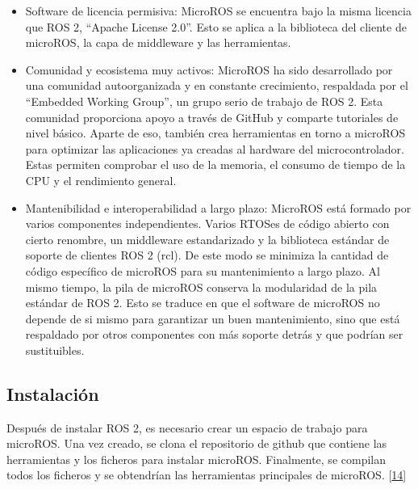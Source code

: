 \documentclass[a4paper,11pt,spanish]{sphinxmanual}
\begin{document}
\begin{itemize}
\item {} 
\sphinxAtStartPar
Software de licencia permisiva: Micro\sphinxhyphen{}ROS se encuentra bajo la misma
licencia que ROS 2, “Apache License 2.0”. Esto se aplica a la
biblioteca del cliente de micro\sphinxhyphen{}ROS, la capa de middleware y las
herramientas.

\item {} 
\sphinxAtStartPar
Comunidad y ecosistema muy activos: Micro\sphinxhyphen{}ROS ha sido desarrollado
por una comunidad auto\sphinxhyphen{}organizada y en constante crecimiento,
respaldada por el “Embedded Working Group”, un grupo serio de trabajo
de ROS 2. Esta comunidad proporciona apoyo a través de GitHub y
comparte tutoriales de nivel básico. Aparte de eso, también crea
herramientas en torno a micro\sphinxhyphen{}ROS para optimizar las aplicaciones ya
creadas al hardware del microcontrolador. Estas permiten comprobar el
uso de la memoria, el consumo de tiempo de la CPU y el rendimiento
general.

\item {} 
\sphinxAtStartPar
Mantenibilidad e interoperabilidad a largo plazo: Micro\sphinxhyphen{}ROS está
formado por varios componentes independientes. Varios RTOSes de
código abierto con cierto renombre, un middleware estandarizado y la
biblioteca estándar de soporte de clientes ROS 2 (rcl). De este modo
se minimiza la cantidad de código específico de micro\sphinxhyphen{}ROS para su
mantenimiento a largo plazo. Al mismo tiempo, la pila de micro\sphinxhyphen{}ROS
conserva la modularidad de la pila estándar de ROS 2. Esto se traduce
en que el software de micro\sphinxhyphen{}ROS no depende de si mismo para
garantizar un buen mantenimiento, sino que está respaldado por otros
componentes con más soporte detrás y que podrían ser sustituibles.

\end{itemize}


\subsection{Instalación}
\label{\detokenize{software:id6}}
\sphinxAtStartPar
Después de instalar ROS 2, es necesario crear un espacio de trabajo para
micro\sphinxhyphen{}ROS. Una vez creado, se clona el repositorio de github que
contiene las herramientas y los ficheros para instalar micro\sphinxhyphen{}ROS.
Finalmente, se compilan todos los ficheros y se obtendrían las
herramientas principales de micro\sphinxhyphen{}ROS. {[}\hyperlink{cite.marco_teorico_y_estado_del_arte:id19}{14}{]}
\end{document}
